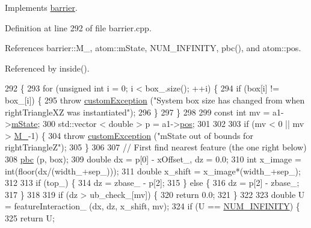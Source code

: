Implements \hyperlink{classbarrier_a2d308cfd5709aa479d0b37733f1a0db7}{barrier}.



Definition at line 292 of file barrier.\-cpp.



References barrier\-::\-M\-\_\-, atom\-::m\-State, N\-U\-M\-\_\-\-I\-N\-F\-I\-N\-I\-T\-Y, pbc(), and atom\-::pos.



Referenced by inside().


\begin{DoxyCode}
292                                                                                \{
293     \textcolor{keywordflow}{for} (\textcolor{keywordtype}{unsigned} \textcolor{keywordtype}{int} i = 0; i < box\_.size(); ++i) \{
294         \textcolor{keywordflow}{if} (box[i] != box\_[i]) \{
295             \textcolor{keywordflow}{throw} \hyperlink{classcustom_exception}{customException} (\textcolor{stringliteral}{"System box size has changed from when rightTriangleXZ
       was instantiated"});
296         \}
297     \}
298 
299     \textcolor{keyword}{const} \textcolor{keywordtype}{int} mv = a1->\hyperlink{classatom_a3cb00c0c5b7533657e05af6ff4a42740}{mState};
300     std::vector < double > p = a1->\hyperlink{classatom_a3ae5f4880e7831d8b2c9fda72b4eb24a}{pos};
301 
302 
303     \textcolor{keywordflow}{if} (mv < 0 || mv > \hyperlink{classbarrier_a274cf283ffc97c22ffa9a4258369c400}{M\_}-1) \{
304         \textcolor{keywordflow}{throw} \hyperlink{classcustom_exception}{customException} (\textcolor{stringliteral}{"mState out of bounds for rightTriangleZ"});
305     \}
306 
307     \textcolor{comment}{// First find nearest feature (the one right below)}
308     \hyperlink{utilities_8cpp_ad858a38f435e9a0ee890aa0f526714d2}{pbc} (p, box);
309     \textcolor{keywordtype}{double} dx = p[0] - xOffset\_, dz = 0.0;
310     \textcolor{keywordtype}{int} x\_image = int(floor(dx/(width\_+sep\_)));
311     \textcolor{keywordtype}{double} x\_shift = x\_image*(width\_+sep\_);
312 
313     \textcolor{keywordflow}{if} (top\_) \{
314         dz = zbase\_ - p[2];
315     \} \textcolor{keywordflow}{else} \{
316         dz = p[2] - zbase\_;
317     \}
318 
319     \textcolor{keywordflow}{if} (dz > ub\_check\_[mv]) \{
320         \textcolor{keywordflow}{return} 0.0;
321     \}
322 
323     \textcolor{keywordtype}{double} U = featureInteraction\_ (dx, dz, x\_shift, mv);
324     \textcolor{keywordflow}{if} (U == \hyperlink{potentials_8h_ab94ab1d09e2291d03fe92a0e24a9d33b}{NUM\_INFINITY}) \{
325         \textcolor{keywordflow}{return} U;

\end{DoxyCode}
